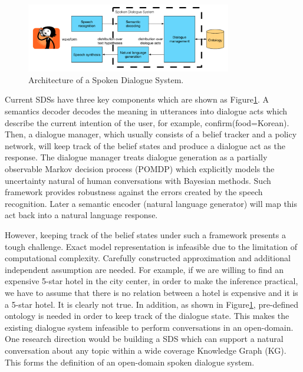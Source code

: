 \documentclass[bsc,frontabs,twoside,singlespacing,parskip,deptreport]{infthesis}     %
\begin{document}
\begin{figure}[h]
    \centering
    \includegraphics[width=0.80\textwidth]{sds.png}
    \caption{Architecture of a Spoken Dialogue System.\cite{gasic}}
    \label{fig:sds}
\end{figure}

Current SDSs have three key components which are shown as Figure\ref{fig:sds}. A semantics decoder decodes the meaning in utterances into dialogue acts which describe the current intention of the user, for example, confirm(food=Korean). Then, a dialogue manager, which usually consists of a belief tracker and a policy network, will keep track of the belief states and produce a dialogue act as the response. The dialogue manager treats dialogue generation as a partially observable Markov decision process (POMDP)\cite{williams2007partially,young2013pomdp,young2010hidden} which explicitly models the uncertainty natural of human conversations with Bayesian methods. Such framework provides robustness against the errors created by the speech recognition. Later a semantic encoder (natural language generator) will map this act back into a natural language response.

However, keeping track of the belief states under such a framework presents a tough challenge. Exact model representation is infeasible due to the limitation of computational complexity\cite{young2013pomdp}. Carefully constructed approximation and additional independent assumption are needed. For example, if we are willing to find an expensive 5-star hotel in the city center, in order to make the inference practical, we have to assume that there is no relation between a hotel is expensive and it is a 5-star hotel. It is clearly not true. In addition, as shown in Figure\ref{fig:sds}, pre-defined ontology is needed in order to keep track of the dialogue state. This makes the existing dialogue system infeasible to perform conversations in an open-domain. One research direction would be building a SDS which can support a natural conversation about any topic within a wide coverage Knowledge Graph (KG). This forms the definition of an open-domain spoken dialogue system\cite{opendomain}.
\end{document}
